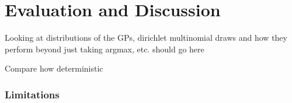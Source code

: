 \chapter{Evaluation and Discussion} \label{chap:evaluation}

Looking at distributions of the GPs, dirichlet multinomial draws and how they perform beyond just taking argmax, etc. should go here

Compare how deterministic

\subsection{Limitations}
